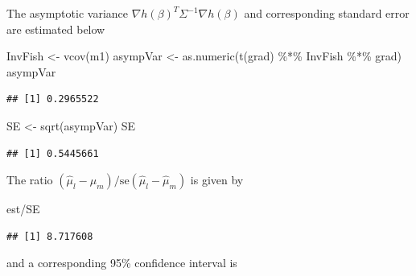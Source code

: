 \documentclass[
  ignorenonframetext,
]{beamer}
\newenvironment{Shaded}{\begin{snugshade}}{\end{snugshade}}
\newcommand{\FunctionTok}[1]{\textcolor[rgb]{0.00,0.00,0.00}{#1}}
\newcommand{\NormalTok}[1]{#1}
\newcommand{\OtherTok}[1]{\textcolor[rgb]{0.56,0.35,0.01}{#1}}
\newcommand{\SpecialCharTok}[1]{\textcolor[rgb]{0.00,0.00,0.00}{#1}}
\begin{document}
\begin{frame}[fragile]{}
\protect\hypertarget{section-17}{}
The asymptotic variance \(\nabla h(\beta)^T\Sigma^{-1}\nabla h(\beta)\)
and corresponding standard error are estimated below

\vspace{12pt}
\tiny

\begin{Shaded}
\begin{Highlighting}[]
\NormalTok{InvFish }\OtherTok{\textless{}{-}} \FunctionTok{vcov}\NormalTok{(m1)}
\NormalTok{asympVar }\OtherTok{\textless{}{-}} \FunctionTok{as.numeric}\NormalTok{(}\FunctionTok{t}\NormalTok{(grad) }\SpecialCharTok{\%*\%}\NormalTok{ InvFish }\SpecialCharTok{\%*\%}\NormalTok{ grad)}
\NormalTok{asympVar}
\end{Highlighting}
\end{Shaded}

\begin{verbatim}
## [1] 0.2965522
\end{verbatim}

\begin{Shaded}
\begin{Highlighting}[]
\NormalTok{SE }\OtherTok{\textless{}{-}} \FunctionTok{sqrt}\NormalTok{(asympVar)}
\NormalTok{SE}
\end{Highlighting}
\end{Shaded}

\begin{verbatim}
## [1] 0.5445661
\end{verbatim}

\vspace{12pt}
\normalsize

The ratio \((\hat\mu_l - \hat\mu_m)/\text{se}(\hat\mu_l - \hat\mu_m)\)
is given by

\vspace{12pt}
\tiny

\begin{Shaded}
\begin{Highlighting}[]
\NormalTok{est}\SpecialCharTok{/}\NormalTok{SE}
\end{Highlighting}
\end{Shaded}

\begin{verbatim}
## [1] 8.717608
\end{verbatim}

\vspace{12pt}
\normalsize

and a corresponding 95\% confidence interval is


\end{frame}
\end{document}

